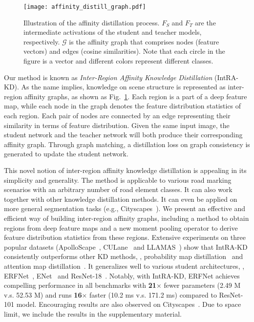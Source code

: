 \documentclass[10pt,twocolumn,letterpaper]{article}
\begin{document}
\begin{figure}[t]
 \centering
 \texttt{[image: affinity\_distill\_graph.pdf]}
 \vskip -0.2cm
 \caption{Illustration of the affinity distillation process. $F_{S}$ and $F_{T}$ are the intermediate activations of the student and teacher models, respectively. $\mathcal{G}$ is the affinity graph that comprises nodes (feature vectors) and edges (cosine similarities). Note that each circle in the figure is a vector and different colors represent different classes.}
 \centering
 \vskip -0.4cm
 \label{fig:graph_map}
\end{figure}

Our method is known as \textit{Inter-Region Affinity Knowledge Distillation} (IntRA-KD). 
As the name implies, knowledge on scene structure is represented as inter-region affinity graphs, as shown as Fig.~\ref{fig:graph_map}. Each region is a part of a deep feature map, while each node in the graph denotes the feature distribution statistics of each region. Each pair of nodes are connected by an edge representing their similarity in terms of feature distribution.
Given the same input image, the student network and the teacher network will both produce their corresponding affinity graph. Through graph matching, a distillation loss on graph consistency is generated to update the student network.


This novel notion of inter-region affinity knowledge distillation is appealing in its simplicity and generality. The method is applicable to various road marking scenarios with an arbitrary number of road element classes. It can also work together with other knowledge distillation methods. It can even be applied on more general segmentation tasks (e.g., Cityscapes~\cite{cordts2016cityscapes}).
We present an effective and efficient way of building inter-region affinity graphs, including a method to obtain regions from deep feature maps and a new moment pooling operator to derive feature distribution statistics from these regions.
Extensive experiments on three popular datasets (ApolloScape~\cite{huang2018apolloscape}, CULane~\cite{pan2017spatial} and LLAMAS~\cite{llamas2019}) show that IntRA-KD consistently outperforms other KD methods, \eg, probability map distillation~\cite{hinton2015distilling} and attention map distillation~\cite{zagoruyko2016paying}. It generalizes well to various student architectures, \eg, ERFNet~\cite{romera2017erfnet}, ENet~\cite{paszke2016enet} and ResNet-18~\cite{he2016deep}. Notably, with IntRA-KD, ERFNet achieves compelling performance in all benchmarks with \textbf{21}$\times$ fewer parameters (2.49 M v.s. 52.53 M) and runs \textbf{16}$\times$ faster (10.2 ms v.s. 171.2 ms) compared to ResNet-101 model. Encouraging results are also observed on Cityscapes~\cite{cordts2016cityscapes}. Due to space limit, we include the results in the supplementary material. 
 
\end{document}
